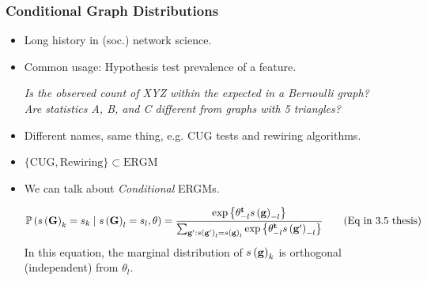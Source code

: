 \documentclass[aspectratio=169, 9pt, handout]{beamer}
\begin{document}
\begin{frame}
	\frametitle{Conditional Graph Distributions}
	
	\begin{itemize}
		\item Long history in (soc.) network science.\pause
		\item Common usage: Hypothesis test prevalence of a feature.\pause{}
		\begin{center}\it
			Is the observed count of XYZ within the expected in a \alert{Bernoulli graph}? \\ \pause{}
			Are statistics A, B, and C different from \alert{graphs with 5 triangles}?
		\end{center}
		\item Different names, same thing, e.g. CUG tests and rewiring algorithms.\pause
		\item $\{\mbox{CUG}, \mbox{Rewiring}\}\subset \mbox{ERGM}$\pause
		\item We can talk about \textit{Conditional} ERGMs.
		
		\begin{equation*}
		\Prcond{\sufstats{\Graph}_k = s_k}{\sufstats{\Graph}_l = s_l, \theta} = %
		\frac{%
			\exp{\transpose{\theta}_{-l}\sufstats{\graph}_{-l}}
		}{%
			\sum_{\graph': \sufstats{\graph'}_l = \sufstats{\graph}_l}\exp{\transpose{\theta}_{-l}\sufstats{\graph'}_{-l}}
		}\tag{Eq in 3.5 thesis}
		\end{equation*}
		\pause In this equation, the marginal distribution of $s\left(\mathbf{g}\right)_k$ is orthogonal (independent) from $\theta_l$.
		
		
	\end{itemize}
	
	\vfill\hfill\hyperlink{discrete-exponential}{}
	
\end{frame}

\end{document}
